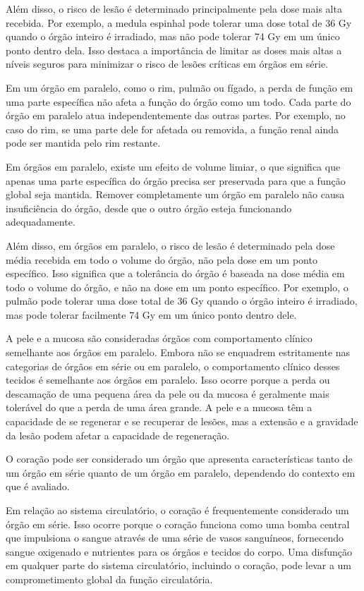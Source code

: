 \documentclass[11pt,a4paper]{article}
\newcounter{exemplo}
\begin{document}
	Além disso, o risco de lesão é determinado principalmente pela dose mais alta recebida. Por exemplo, a medula espinhal pode tolerar uma dose total de 36 Gy quando o órgão inteiro é irradiado, mas não pode tolerar 74 Gy em um único ponto dentro dela. Isso destaca a importância de limitar as doses mais altas a níveis seguros para minimizar o risco de lesões críticas em órgãos em série.

	Em um órgão em paralelo, como o rim, pulmão ou fígado, a perda de função em uma parte específica não afeta a função do órgão como um todo. Cada parte do órgão em paralelo atua independentemente das outras partes. Por exemplo, no caso do rim, se uma parte dele for afetada ou removida, a função renal ainda pode ser mantida pelo rim restante.

	Em órgãos em paralelo, existe um efeito de volume limiar, o que significa que apenas uma parte específica do órgão precisa ser preservada para que a função global seja mantida. Remover completamente um órgão em paralelo não causa insuficiência do órgão, desde que o outro órgão esteja funcionando adequadamente.
	
	Além disso, em órgãos em paralelo, o risco de lesão é determinado pela dose média recebida em todo o volume do órgão, não pela dose em um ponto específico. Isso significa que a tolerância do órgão é baseada na dose média em todo o volume do órgão, e não na dose em um ponto específico. Por exemplo, o pulmão pode tolerar uma dose total de 36 Gy quando o órgão inteiro é irradiado, mas pode tolerar facilmente 74 Gy em um único ponto dentro dele.

	A pele e a mucosa são consideradas órgãos com comportamento clínico semelhante aos órgãos em paralelo. Embora não se enquadrem estritamente nas categorias de órgãos em série ou em paralelo, o comportamento clínico desses tecidos é semelhante aos órgãos em paralelo. Isso ocorre porque a perda ou descamação de uma pequena área da pele ou da mucosa é geralmente mais tolerável do que a perda de uma área grande. A pele e a mucosa têm a capacidade de se regenerar e se recuperar de lesões, mas a extensão e a gravidade da lesão podem afetar a capacidade de regeneração.

	O coração pode ser considerado um órgão que apresenta características tanto de um órgão em série quanto de um órgão em paralelo, dependendo do contexto em que é avaliado.

	Em relação ao sistema circulatório, o coração é frequentemente considerado um órgão em série. Isso ocorre porque o coração funciona como uma bomba central que impulsiona o sangue através de uma série de vasos sanguíneos, fornecendo sangue oxigenado e nutrientes para os órgãos e tecidos do corpo. Uma disfunção em qualquer parte do sistema circulatório, incluindo o coração, pode levar a um comprometimento global da função circulatória.
	
\end{document}
